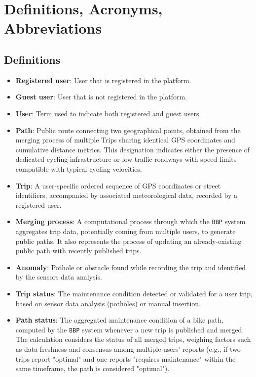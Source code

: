 \section{Definitions, Acronyms, Abbreviations}
\label{sec:definitions}

\subsection{Definitions}
\begin{itemize}
    \item \textbf{Registered user}: User that is registered in the platform.
    \item \textbf{Guest user}: User that is not registered in the platform.
    \item \textbf{User}: Term used to indicate both registered and guest users.
    \item \textbf{Path}: Public route connecting two geographical points, obtained from the merging process of multiple Trips sharing identical GPS coordinates and cumulative distance metrics. This designation indicates either the presence of dedicated cycling infrastructure or low-traffic roadways with speed limits compatible with typical cycling velocities.
    \item \textbf{Trip}: A user-specific ordered sequence of GPS coordinates or street identifiers, accompanied by associated meteorological data, recorded by a registered user.
    \item \textbf{Merging process}: A computational process through which the \texttt{BBP} system aggregates trip data, potentially coming from multiple users, to generate public paths. It also represents the process of updating an already-existing public path with recently published trips.
    \item \textbf{Anomaly}: Pothole or obstacle found while recording the trip and identified by the sensors data analysis.
    \item \textbf{Trip status}: The maintenance condition detected or validated for a user trip, based on sensor data analysis (potholes) or manual insertion.
    \item \textbf{Path status}: The aggregated maintenance condition of a bike path, computed by the \texttt{BBP} system whenever a new trip is published and merged. The calculation considers the status of all merged trips, weighing factors such as data freshness and consensus among multiple users' reports (e.g., if two trips report "optimal" and one reports "requires maintenance" within the same timeframe, the path is considered "optimal").

\end{itemize}
